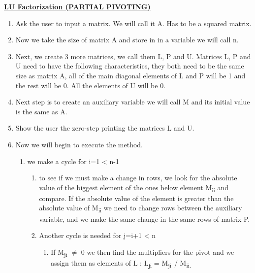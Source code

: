 \documentclass[12pt]{article}
\renewcommand{\_}{\kern-1.5pt\textunderscore\kern-1.5pt}
\begin{document}
\textbf{\uline{LU Factorization (PARTIAL PIVOTING)}}\par

\begin{enumerate}
	\item Ask the user to input a matrix. We will call it A. Has to be a squared matrix. \par

	\item Now we take the size of matrix A and store in in a variable we will call n. \par

	\item Next, we create 3 more matrices, we call them L, P and U. Matrices L, P and U need to have the following characteristics, they both need to be the same size as matrix A, all of the main diagonal elements of L and P will be 1 and the rest will be 0. All the elements of U will be 0. \par

	\item Next step is to create an auxiliary variable we will call M and its initial value is the same as A.\par

	\item Show the user the zero-step printing the matrices L and U.\par

	\item Now we will begin to execute the method.\par

\begin{enumerate}
	\item we make a cycle for i=1 < n-1\par

\begin{enumerate}
	\item to see if we must make a change in rows, we look for the absolute value of the biggest element of the ones below element M\textsubscript{ii }and compare. If the absolute value of the element is greater than the absolute value of M\textsubscript{ii }we need to change rows between the auxiliary variable, and we make the same change in the same rows of matrix P.\par

	\item Another cycle is needed for j=i+1 < n\par

\begin{enumerate}
	\item If M\textsubscript{ji} $ \neq $  0\textsubscript{ }we then find the multipliers for the pivot and we assign them as elements of L : L\textsubscript{ji }= M\textsubscript{ji\  }/ M\textsubscript{ii. }\par



\end{enumerate}
\end{enumerate}
\end{enumerate}
\end{enumerate}
\end{document}
